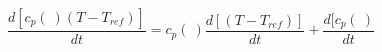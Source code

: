 \begin{equation}
\frac{d [c_p(\ ) (T- T_{ref})]}{dt} =c_p(\ ) \frac{d [ (T- T_{ref})]}{dt} + \frac{d [c_p(\ ) }{dt}
\end{equation}